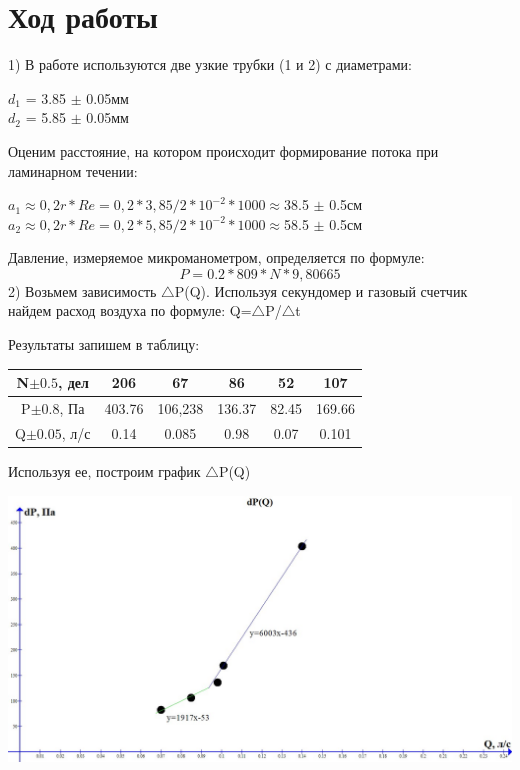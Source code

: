 \documentclass[a4paper,12pt]{article} %
\begin{document}
\section{Ход работы}

1)
В работе используются две узкие трубки (1 и 2) с диаметрами:

$d_1$ = 3.85 $\pm$ 0.05мм\\

$d_2$ = 5.85 $\pm$ 0.05мм

Оценим расстояние, на котором происходит формирование потока при ламинарном течении:

$a_1$$\approx0,2r*Re=0,2*3,85/2*10^{-2}*1000\approx$38.5 $\pm$ 0.5см\\

$a_2$$\approx0,2r*Re=0,2*5,85/2*10^{-2}*1000\approx$58.5 $\pm$ 0.5см

Давление, измеряемое микроманометром, определяется по формуле:
$$P=0.2*809*N*9,80665$$
2) Возьмем зависимость $\triangle$P(Q). Используя секундомер и газовый счетчик найдем расход воздуха по формуле: Q=$\triangle$P/$\triangle$t

Результаты запишем в таблицу:

\begin{tabular}{|c|c|c|c|c|c|}
\hline 
N$\pm0.5$, дел & 206 & 67 & 86 & 52 & 107 \\ 
\hline 
P$\pm0.8$, Па & 403.76 & 106,238 & 136.37 & 82.45 & 169.66 \\ 
\hline 
Q$\pm0.05$, л/с & 0.14 & 0.085 & 0.98 & 0.07 & 0.101 \\ 
\hline 
\end{tabular} 
\newpage

Используя ее, построим график $\triangle$P(Q)

\begin{center}
\includegraphics[scale=0.33]{1331}
\end{center}
\end{document}

